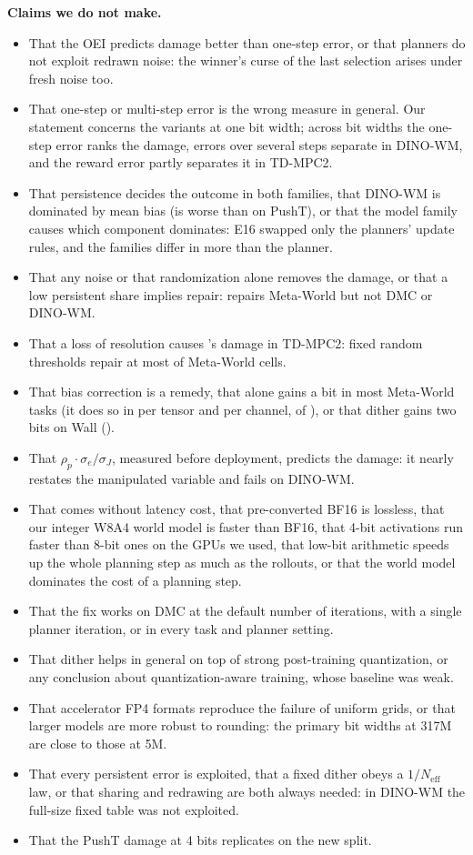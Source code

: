 \textbf{Claims we do not make.}
\begin{itemize}\setlength{\itemsep}{1pt}\setlength{\parskip}{0pt}
\item That the OEI predicts damage better than one-step error, or that planners do not exploit redrawn noise: the winner's curse of the last selection arises under fresh noise too.
\item That one-step or multi-step error is the wrong measure in general. Our statement concerns the variants at one bit width; across bit widths the one-step error ranks the damage, errors over several steps separate \dtm in DINO-WM, and the reward error partly separates it in TD-MPC2.
\item That persistence decides the outcome in both families, that DINO-WM is dominated by mean bias (\detbc is worse than \dtm on PushT), or that the model family causes which component dominates: E16 swapped only the planners' update rules, and the families differ in more than the planner.
\item That any noise or that randomization alone removes the damage, or that a low persistent share implies repair: \detnoise repairs Meta-World but not DMC or DINO-WM.
\item That a loss of resolution causes \dtm's damage in TD-MPC2: fixed random thresholds repair at most  of  Meta-World cells.
\item That bias correction is a remedy, that \shiter alone gains a bit in most Meta-World tasks (it does so in  per tensor and  per channel, of ), or that dither gains two bits on Wall ().
\item That $\rho_p\cdot\sigma_e/\sigma_J$, measured before deployment, predicts the damage: it nearly restates the manipulated variable and fails on DINO-WM.
\item That \detshift comes without latency cost, that pre-converted BF16 is lossless, that our integer W8A4 world model is faster than BF16, that 4-bit activations run faster than 8-bit ones on the GPUs we used, that low-bit arithmetic speeds up the whole planning step as much as the rollouts, or that the world model dominates the cost of a planning step.
\item That the fix works on DMC at the default number of iterations, with a single planner iteration, or in every task and planner setting.
\item That dither helps in general on top of strong post-training quantization, or any conclusion about quantization-aware training, whose baseline was weak.
\item That accelerator FP4 formats reproduce the failure of uniform grids, or that larger models are more robust to rounding: the primary bit widths at 317M are close to those at 5M.
\item That every persistent error is exploited, that a fixed dither obeys a $1/N_{\mathrm{eff}}$ law, or that sharing and redrawing are both always needed: in DINO-WM the full-size fixed table was not exploited.
\item That the PushT damage at 4 bits replicates on the new split.
\end{itemize}
